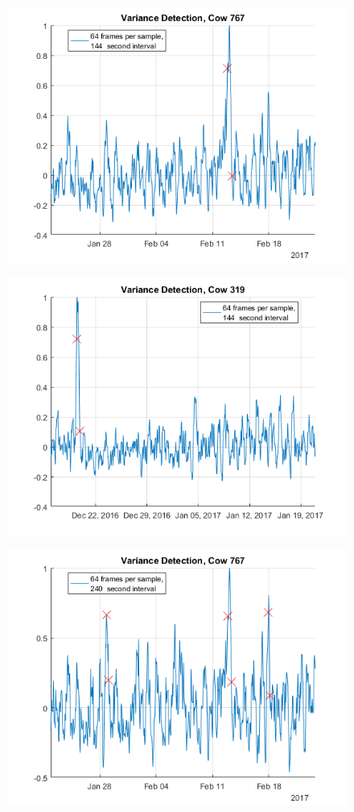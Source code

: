 \begin{figure}[htb]
\centering
\includegraphics[width = 0.75 \textwidth]{figures/VarianceDetectionCow767_64frames144seconds.png}
\caption{}
\label{VarianceDetectionCow767_64frames144seconds}
\end{figure}

\begin{figure}[htb]
\centering
\includegraphics[width = 0.75 \textwidth]{figures/VarianceDetectionCow319_64frames144seconds.png}
\caption{}
\label{VarianceDetectionCow319_64frames144seconds}
\end{figure}

\begin{figure}[htb]
\centering
\includegraphics[width = 0.75 \textwidth]{figures/VarianceDetectionCow767_64frames240seconds.png}
\caption{}
\label{VarianceDetectionCow767_64frames240seconds}
\end{figure}


